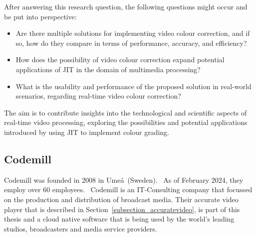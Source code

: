 \documentclass[12pt,a4paper]{article}
\begin{document}
After answering this research question, the following questions might occur and be put into perspective:

\begin{itemize}
	\item Are there multiple solutions for implementing video colour correction, and if so, how do they compare in terms of performance, accuracy, and efficiency?
	\item How does the possibility of video colour correction expand potential applications of JIT in the domain of multimedia processing?
	\item What is the usability and performance of the proposed solution in real-world scenarios, regarding real-time video colour correction?
\end{itemize}

The aim is to contribute insights into the technological and scientific aspects of real-time video processing, exploring the possibilities and potential applications introduced by using JIT to implement colour grading. 







\subsection{Codemill} 

Codemill was founded in 2008 in Ume\aa \ (Sweden).~\cite{codemill_old, codemill_now, codemill_linkedin} 
As of February 2024, they employ over 60 employees.~\cite{codemill} 
Codemill is an IT-Consulting company that focussed on the production and distribution of broadcast media. Their accurate video player that is described in Section~\ref{subsection_accuratevideo}, is part of this thesis and a cloud native software that is being used by the world's leading studios, broadcasters and media service providers.~\cite{codemill_linkedin, codemill_avp} 





\end{document}
